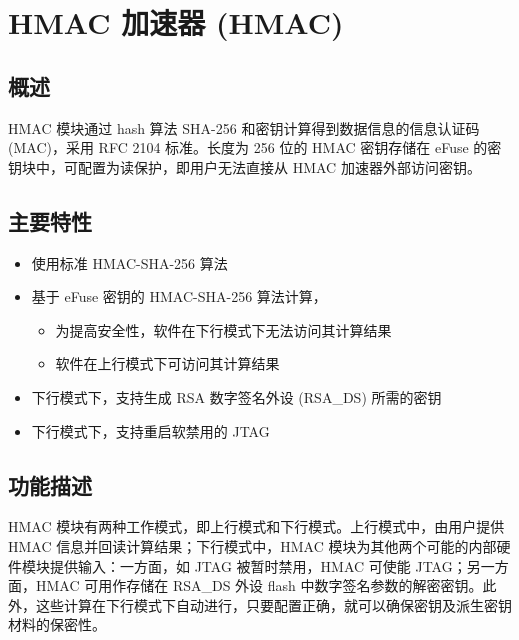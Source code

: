 \documentclass[main\_\_CN.tex]{subfiles}
\begin{document}

\ifglobal
\else
    \listoftodos
    {\let\clearpage\relax \listofdonetodos}
    \tableofcontents
\fi



\hypertarget{hmac}{}
\chapter{HMAC 加速器 (HMAC)}
\label{mod:hmac}

\section{概述}

HMAC 模块通过 hash 算法 SHA-256 和密钥计算得到数据信息的信息认证码 (MAC)，采用 RFC 2104 标准。长度为 256 位的 HMAC 密钥存储在 eFuse 的密钥块中，可配置为读保护，即用户无法直接从 HMAC 加速器外部访问密钥。

\section{主要特性}

\begin{itemize}
    \item 使用标准 HMAC-SHA-256 算法
    \item 基于 eFuse 密钥的 HMAC-SHA-256 算法计算，
    \begin{itemize}
    \item 为提高安全性，软件在下行模式下无法访问其计算结果
    \item 软件在上行模式下可访问其计算结果
    \end{itemize}
    \item 下行模式下，支持生成 RSA 数字签名外设 (RSA\_DS) 所需的密钥
    \item 下行模式下，支持重启软禁用的 JTAG
\end{itemize}

\section{功能描述}

HMAC 模块有两种工作模式，即上行模式和下行模式。上行模式中，由用户提供 HMAC 信息并回读计算结果；下行模式中，HMAC 模块为其他两个可能的内部硬件模块提供输入：一方面，如 JTAG 被暂时禁用，HMAC 可使能 JTAG；另一方面，HMAC 可用作存储在 RSA\_DS 外设 flash 中数字签名参数的解密密钥。此外，这些计算在下行模式下自动进行，只要配置正确，就可以确保密钥及派生密钥材料的保密性。
\end{document}
